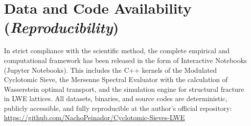 \documentclass{article}
\numberwithin{equation}{section}
\theoremstyle{plain}
\theoremstyle{definition}
\begin{document}
\section*{Data and Code Availability (\textit{Reproducibility})}
In strict compliance with the scientific method, the complete empirical and computational framework has been released in the form of Interactive Notebooks (Jupyter Notebooks). This includes the C++ kernels of the Modulated Cyclotomic Sieve, the Mersenne Spectral Evaluator with the calculation of Wasserstein optimal transport, and the simulation engine for structural fracture in LWE lattices. All datasets, binaries, and source codes are deterministic, publicly accessible, and fully reproducible at the author’s official repository: \\
\url{https://github.com/NachoPeinador/Cyclotomic-Sieves-LWE}
\end{document}
